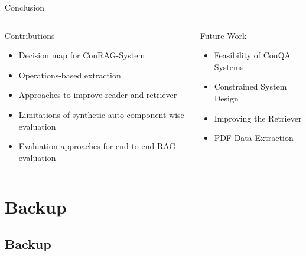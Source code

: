 \documentclass{beamer}
\begin{document}
\begin{frame}{Conclusion}
  \begin{columns}[T]
    \begin{column}{.5\textwidth}
      {\color{unirot}Contributions}
      \begin{itemize}
        \item Decision map for ConRAG-System
        \item Operations-based extraction
        \item Approaches to improve reader and retriever
        \item Limitations of synthetic auto component-wise evaluation
        \item Evaluation approaches for end-to-end RAG evaluation
      \end{itemize}
    \end{column}
    \begin{column}{.5\textwidth}
      {\color{unirot}Future Work}
      \begin{itemize}
        \item Feasibility of ConQA Systems
        \item Constrained System Design
        \item Improving the Retriever
        \item PDF Data Extraction
      \end{itemize}
    \end{column}
  \end{columns}
\end{frame}


\section*{Backup}

\subsection*{Backup}
\end{document}
